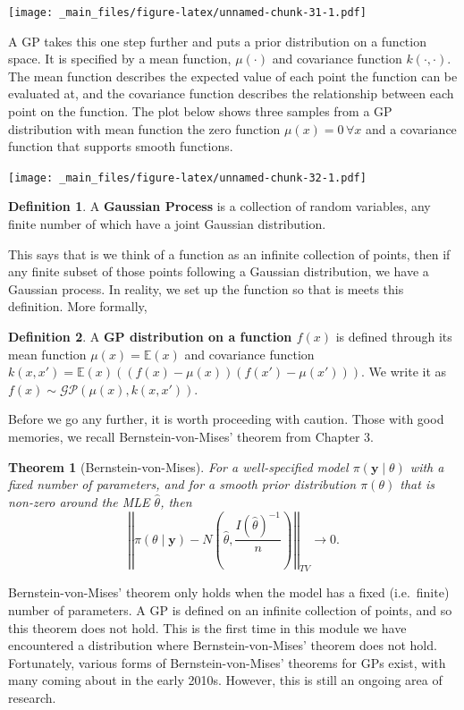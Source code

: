 \documentclass[
]{book}
\newtheorem{theorem}{Theorem}[chapter]
\theoremstyle{definition}
\newtheorem{definition}{Definition}[chapter]
\theoremstyle{definition}
\theoremstyle{definition}
\theoremstyle{definition}
\theoremstyle{remark}
\begin{document}
\texttt{[image: \_main\_files/figure-latex/unnamed-chunk-31-1.pdf]}

A GP takes this one step further and puts a prior distribution on a function space. It is specified by a mean function, \(\mu(\cdot)\) and covariance function \(k(\cdot, \cdot)\). The mean function describes the expected value of each point the function can be evaluated at, and the covariance function describes the relationship between each point on the function. The plot below shows three samples from a GP distribution with mean function the zero function \(\mu(x) = 0\, \forall x\) and a covariance function that supports smooth functions.

\texttt{[image: \_main\_files/figure-latex/unnamed-chunk-32-1.pdf]}

\begin{definition}
A \textbf{Gaussian Process} is a collection of random variables, any finite number of which have a joint Gaussian distribution.
\end{definition}

This says that is we think of a function as an infinite collection of points, then if any finite subset of those points following a Gaussian distribution, we have a Gaussian process. In reality, we set up the function so that is meets this definition. More formally,

\begin{definition}
A \textbf{GP distribution on a function \(f(x)\)} is defined through its mean function \(\mu(x) = \mathbb{E}(x)\) and covariance function \(k(x, x') = \mathbb{E}(x)\left((f(x) - \mu(x))(f(x') - \mu(x'))\right)\). We write it as \(f(x) \sim \mathcal{GP}(\mu(x), k(x, x'))\).
\end{definition}

Before we go any further, it is worth proceeding with caution. Those with good memories, we recall Bernstein-von-Mises' theorem from Chapter 3.

\begin{theorem}[Bernstein-von-Mises]
For a well-specified model \(\pi(\boldsymbol{y} \mid \theta)\) with a fixed number of parameters, and for a smooth prior distribution \(\pi(\theta)\) that is non-zero around the MLE \(\hat{\theta}\), then
\[
\left|\left| \pi(\theta \mid \boldsymbol{y}) - N\left(\hat{\theta}, \frac{I(\hat{\theta})^{-1}}{n}\right) \right|\right|_{TV} \rightarrow 0.
\]
\end{theorem}

Bernstein-von-Mises' theorem only holds when the model has a fixed (i.e.~finite) number of parameters. A GP is defined on an infinite collection of points, and so this theorem does not hold. This is the first time in this module we have encountered a distribution where Bernstein-von-Mises' theorem does not hold. Fortunately, various forms of Bernstein-von-Mises' theorems for GPs exist, with many coming about in the early 2010s. However, this is still an ongoing area of research.
\end{document}
